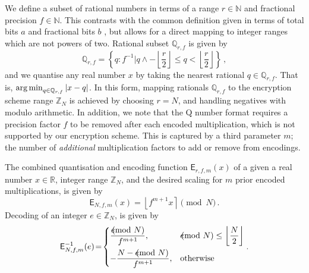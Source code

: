 \documentclass[twocolumn]{autart}
\begin{document}
We define a subset of rational numbers in terms of a range $r \in \mathbb{N}$ and fractional precision $f \in \mathbb{N}$. This contrasts with the common definition given in terms of total bits $a$ and fractional bits $b$ \cite{oberstarFixedPointRepresentationFractional2007,schulzedarupEncryptedCooperativeControl2019,farokhiSecurePrivateControl2017}, but allows for a direct mapping to integer ranges which are not powers of two. Rational subset $\mathbb{Q}_{r,f}$ is given by
\begin{equation*}
    \mathbb{Q}_{r,f} = \left\{q : f^{-1} | q \wedge -\left\lfloor\frac{r}{2}\right\rfloor \leq q < \left\lfloor\frac{r}{2}\right\rfloor \right\}\,,
\end{equation*}
and we quantise any real number $x$ by taking the nearest rational $q \in \mathbb{Q}_{r,f}$. That is, $\operatorname*{arg\,min}_{q\in\mathbb{Q}_{r,f}} |x-q|$. In this form, mapping rationals $\mathbb{Q}_{r,f}$ to the encryption scheme range $\mathbb{Z}_N$ is achieved by choosing $r=N$, and handling negatives with modulo arithmetic. In addition, we note that the Q number format requires a precision factor $f$ to be removed after each encoded multiplication, which is not supported by our encryption scheme. This is captured by a third parameter $m$; the number of \textit{additional} multiplication factors to add or remove from encodings.

The combined quantisation and encoding function $\mathsf{E}_{r,f,m}(x)$ of a given a real number $x \in \mathbb{R}$, integer range $\mathbb{Z}_N$, and the desired scaling for $m$ prior encoded multiplications, is given by
\begin{equation}
    \mathsf{E}_{N,f,m}(x) = \left\lfloor f^{m+1} x \right\rceil \pmod{N}\,. \label{eqn:encode}
\end{equation}
Decoding of an integer $e \in \mathbb{Z}_N$, is given by
\begin{equation}
    \mathsf{E}^{-1}_{N,f,m}(e) \!=\! 
    \begin{dcases}
        \frac{e\hspace{-8pt}\pmod{N}}{f^{m+1}}, &e\hspace{-8pt}\pmod{N} \leq \left\lfloor\frac{N}{2}\right\rfloor \\
        -\frac{N - e\hspace{-8pt}\pmod{N}}{f^{m+1}}, &\text{otherwise} \\
    \end{dcases}.\label{eqn:decode}
\end{equation}
\end{document}
